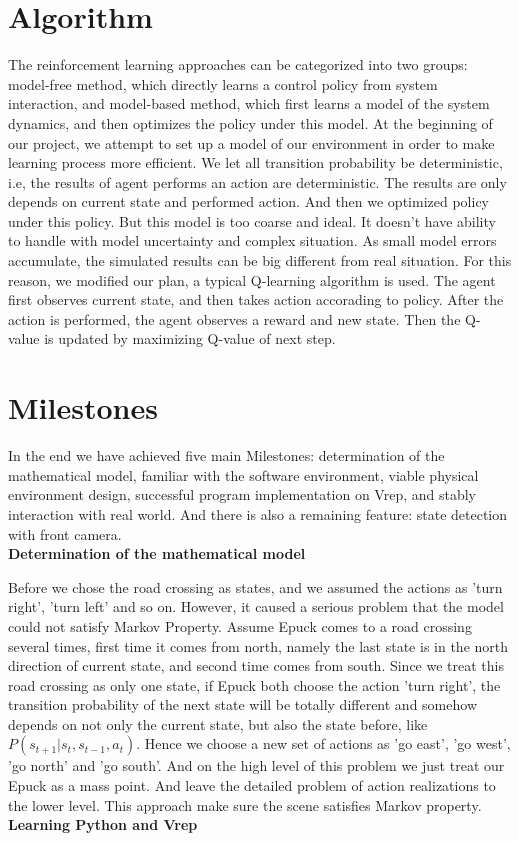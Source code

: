 \documentclass[a4paper, 11pt]{article} %
\begin{document}
\section{Algorithm}
The reinforcement learning approaches can be categorized into two groups: model-free
method, which directly learns a control policy from system interaction, and
model-based method, which first learns a model of the system dynamics, and then
optimizes the policy under this model. At the beginning of our project, we attempt to
set up a model of our environment in order to make learning process more efficient.
We let all transition probability be deterministic, i.e, the results of agent performs
an action are deterministic. The results are only depends on current state and performed
action. And then we optimized policy under this policy. But this model is too coarse
and ideal. It doesn't have ability to handle with model uncertainty and complex situation.
As small model errors accumulate, the simulated results can be big different from
real situation. For this reason, we modified our plan, a typical Q-learning algorithm
is used. The agent first observes current state, and then takes action accorading to
policy. After the action is performed, the agent observes a reward and new state.
Then the Q-value is updated by maximizing Q-value of next step.

\section{Milestones}
In the end we have achieved five main Milestones: determination of the mathematical
model, familiar with the software environment, viable physical environment design,
successful program implementation on Vrep, and stably interaction with real world.
And there is also a remaining feature: state detection with front camera.
\\[3ex]
\textbf{Determination of the mathematical model}

Before we
chose the road crossing as states, and we assumed the actions as 'turn right',
'turn left' and so on. However, it caused a serious problem that the model
could not satisfy Markov Property. Assume Epuck comes to a road crossing
several times, first time it comes from north, namely the last state is in the
north direction of current state, and second time comes from south. Since
we treat this road crossing as only one state, if Epuck both choose the action
'turn right', the transition probability of the next state will be totally different
and somehow depends on not only the current state, but also the state
before, like $P(s_{t+1}|s_t, s_{t-1}, a_t)$. Hence we choose a new set of actions
as 'go east', 'go west', 'go north' and 'go south'. And on the high level of
this problem we just treat our Epuck as a mass point. And leave the detailed
problem of action realizations to the lower level. This approach make sure the
scene satisfies Markov property.
\\[3ex]
\textbf{Learning Python and Vrep }
\end{document}
